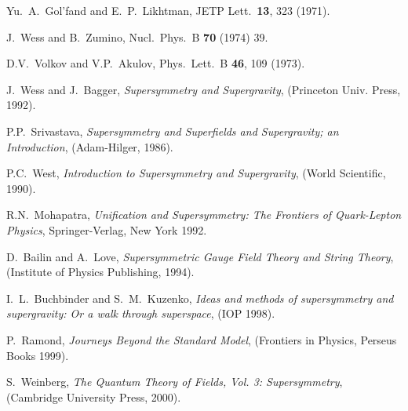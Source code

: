 \documentclass[12pt]{article}
\begin{document}
\begin{thebibliography}{999}
Yu.~A.~Gol'fand and E.~P.~Likhtman,
  JETP Lett.\  {\bf 13}, 323 (1971).

J.~Wess and B.~Zumino,
  Nucl.\ Phys.\ B {\bf 70} (1974) 39.

D.V.~Volkov and V.P.~Akulov,
  Phys.\ Lett.\ B {\bf 46}, 109 (1973).

J.~Wess and J.~Bagger,
  {\em Supersymmetry and Supergravity},
  (Princeton Univ. Press, 1992).

P.P.~Srivastava, 
  {\em Supersymmetry and Superfields and Supergravity; an Introduction}, 
  (Adam-Hilger, 1986).  

P.C.~West, 
  {\em Introduction to Supersymmetry and Supergravity}, 
  (World Scientific, 1990). 

R.N.~Mohapatra,
  {\em Unification and Supersymmetry: The Frontiers of
  Quark-Lepton Physics}, Springer-Verlag, New York 1992.  

D.~Bailin and A.~Love,
  {\em Supersymmetric Gauge Field Theory and String Theory},
  (Institute of Physics Publishing, 1994).

  I.~L.~Buchbinder and S.~M.~Kuzenko,
  {\em Ideas and methods of supersymmetry and supergravity: Or a walk through superspace},
  (IOP 1998).
  
P.~Ramond, 
  {\em Journeys Beyond the Standard Model},
  (Frontiers in Physics, Perseus Books 1999).

S.~Weinberg, 
  {\em The Quantum Theory of Fields, Vol. 3: Supersymmetry},
  (Cambridge University Press, 2000).


\end{thebibliography}
\end{document}
